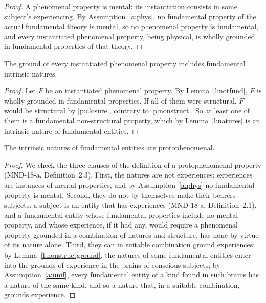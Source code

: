 \documentclass{situationist-preprint}
\begin{document}
\begin{proof}
A phenomenal property is mental: its instantiation consists in some subject's experiencing. By Assumption~\ref{a:phys}, no fundamental property of the actual fundamental theory is mental, so no phenomenal property is fundamental, and every instantiated phenomenal property, being physical, is wholly grounded in fundamental properties of that theory.
\end{proof}

\begin{lemma}\label{l:nonstructground}
The ground of every instantiated phenomenal property includes fundamental intrinsic natures.
\end{lemma}

\begin{proof}
Let $F$ be an instantiated phenomenal property. By Lemma~\ref{l:notfund}, $F$ is wholly grounded in fundamental properties. If all of them were structural, $F$ would be structural by \ref{p:closure}, contrary to \ref{p:nonstruct}. So at least one of them is a fundamental non-structural property, which by Lemma~\ref{l:natures} is an intrinsic nature of fundamental entities.
\end{proof}

\begin{lemma}\label{l:proto}
The intrinsic natures of fundamental entities are protophenomenal.
\end{lemma}

\begin{proof}
We check the three clauses of the definition of a protophenomenal property (MND-18-a, Definition~2.3). First, the natures are not experiences: experiences are instances of mental properties, and by Assumption~\ref{a:phys} no fundamental property is mental. Second, they do not by themselves make their bearers subjects: a subject is an entity that has experiences (MND-18-a, Definition~2.1), and a fundamental entity whose fundamental properties include no mental property, and whose experience, if it had any, would require a phenomenal property grounded in a combination of natures and structure, has none by virtue of its nature alone. Third, they can in suitable combination ground experiences: by Lemma~\ref{l:nonstructground}, the natures of some fundamental entities enter into the grounds of experience in the brains of conscious subjects; by Assumption~\ref{a:unif}, every fundamental entity of a kind found in such brains has a nature of the same kind, and so a nature that, in a suitable combination, grounds experience.
\end{proof}
\end{document}
